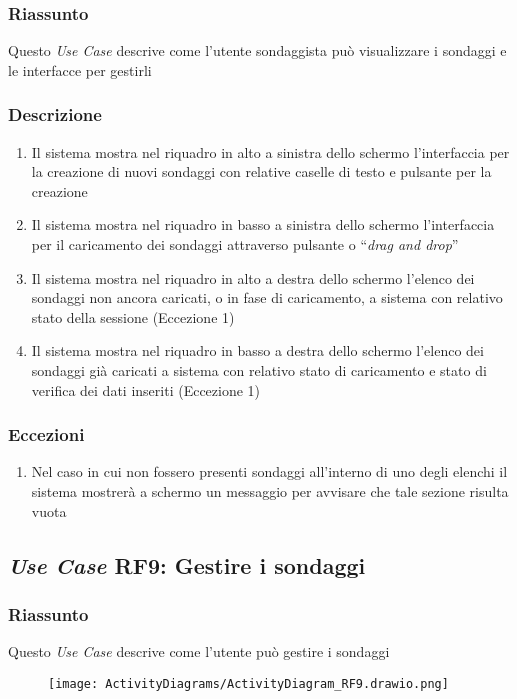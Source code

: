         \subsubsection{Riassunto}
            Questo \textit{Use Case} descrive come l'utente sondaggista può visualizzare i sondaggi e le interfacce per gestirli
        \subsubsection{Descrizione}
            \begin{enumerate}
                \item Il sistema mostra nel riquadro in alto a sinistra dello schermo l'interfaccia per la creazione di nuovi sondaggi con relative caselle di testo e pulsante per la creazione
                \item Il sistema mostra nel riquadro in basso a sinistra dello schermo l'interfaccia per il caricamento dei sondaggi attraverso pulsante o ``\textit{drag and drop}''
                \item Il sistema mostra nel riquadro in alto a destra dello schermo l'elenco dei sondaggi non ancora caricati, o in fase di caricamento, a sistema con relativo stato della sessione (Eccezione 1)
                \item Il sistema mostra nel riquadro in basso a destra dello schermo l'elenco dei sondaggi già caricati a sistema con relativo stato di caricamento e stato di verifica dei dati inseriti (Eccezione 1)
            \end{enumerate}
        \subsubsection{Eccezioni}
            \begin{enumerate}
                \item Nel caso in cui non fossero presenti sondaggi all'interno di uno degli elenchi il sistema mostrerà a schermo un messaggio per avvisare che tale sezione risulta vuota
            \end{enumerate}

    \subsection{\textit{Use Case} RF9: Gestire i sondaggi}
        \subsubsection{Riassunto}
            Questo \textit{Use Case} descrive come l'utente può gestire i sondaggi
             \begin{figure}[H]
                 \texttt{[image: ActivityDiagrams/ActivityDiagram\_RF9.drawio.png]}
             \end{figure}

